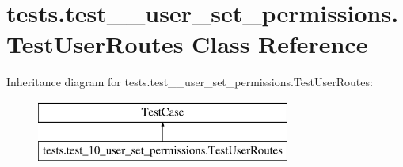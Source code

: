 \hypertarget{classtests_1_1test__10__user__set__permissions_1_1_test_user_routes}{}\section{tests.\+test\+\_\+\_\+user\+\_\+set\+\_\+permissions.\+Test\+User\+Routes Class Reference}
\label{classtests_1_1test__10__user__set__permissions_1_1_test_user_routes}
Inheritance diagram for tests.\+test\+\_\+\_\+user\+\_\+set\+\_\+permissions.\+Test\+User\+Routes\+:\begin{figure}[H]
\begin{center}
\leavevmode
\includegraphics[height=2.000000cm]{classtests_1_1test__10__user__set__permissions_1_1_test_user_routes}
\end{center}
\end{figure}

